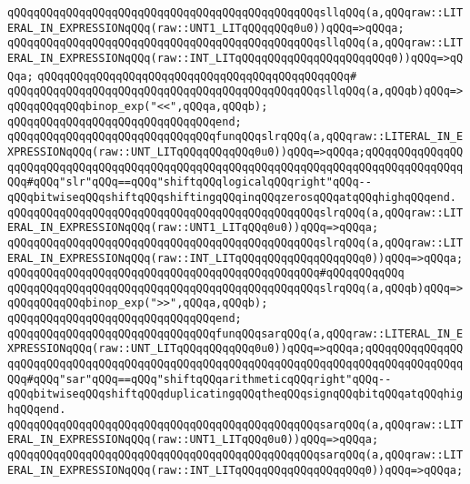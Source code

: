 \verb|qQQqqQQqqQQqqQQqqQQqqQQqqQQqqQQqqQQqqQQqqQQqqQQqsllqQQq(a,qQQqraw::LITERAL_IN_EXPRESSIONqQQq(raw::UNT1_LITqQQqqQQq0u0))qQQq=>qQQqa;|\newline
\verb|qQQqqQQqqQQqqQQqqQQqqQQqqQQqqQQqqQQqqQQqqQQqqQQqsllqQQq(a,qQQqraw::LITERAL_IN_EXPRESSIONqQQq(raw::INT_LITqQQqqQQqqQQqqQQqqQQqqQQq0))qQQq=>qQQqa;|\newline
\verb|qQQqqQQqqQQqqQQqqQQqqQQqqQQqqQQqqQQqqQQqqQQqqQQq#|\newline
\verb|qQQqqQQqqQQqqQQqqQQqqQQqqQQqqQQqqQQqqQQqqQQqqQQqsllqQQq(a,qQQqb)qQQq=>qQQqqQQqqQQqbinop_exp("<<",qQQqa,qQQqb);|\newline
\verb|qQQqqQQqqQQqqQQqqQQqqQQqqQQqqQQqend;|\newline
\newline
\verb|qQQqqQQqqQQqqQQqqQQqqQQqqQQqqQQqfunqQQqslrqQQq(a,qQQqraw::LITERAL_IN_EXPRESSIONqQQq(raw::UNT_LITqQQqqQQqqQQq0u0))qQQq=>qQQqa;qQQqqQQqqQQqqQQqqQQqqQQqqQQqqQQqqQQqqQQqqQQqqQQqqQQqqQQqqQQqqQQqqQQqqQQqqQQqqQQqqQQqqQQq#qQQq"slr"qQQq==qQQq"shiftqQQqlogicalqQQqright"qQQq--qQQqbitwiseqQQqshiftqQQqshiftingqQQqinqQQqzerosqQQqatqQQqhighqQQqend.|\newline
\verb|qQQqqQQqqQQqqQQqqQQqqQQqqQQqqQQqqQQqqQQqqQQqqQQqslrqQQq(a,qQQqraw::LITERAL_IN_EXPRESSIONqQQq(raw::UNT1_LITqQQq0u0))qQQq=>qQQqa;|\newline
\verb|qQQqqQQqqQQqqQQqqQQqqQQqqQQqqQQqqQQqqQQqqQQqqQQqslrqQQq(a,qQQqraw::LITERAL_IN_EXPRESSIONqQQq(raw::INT_LITqQQqqQQqqQQqqQQqqQQq0))qQQq=>qQQqa;|\newline
\verb|qQQqqQQqqQQqqQQqqQQqqQQqqQQqqQQqqQQqqQQqqQQqqQQq#qQQqqQQqqQQq|\newline
\verb|qQQqqQQqqQQqqQQqqQQqqQQqqQQqqQQqqQQqqQQqqQQqqQQqslrqQQq(a,qQQqb)qQQq=>qQQqqQQqqQQqbinop_exp(">>",qQQqa,qQQqb);|\newline
\verb|qQQqqQQqqQQqqQQqqQQqqQQqqQQqqQQqend;|\newline
\newline
\verb|qQQqqQQqqQQqqQQqqQQqqQQqqQQqqQQqfunqQQqsarqQQq(a,qQQqraw::LITERAL_IN_EXPRESSIONqQQq(raw::UNT_LITqQQqqQQqqQQq0u0))qQQq=>qQQqa;qQQqqQQqqQQqqQQqqQQqqQQqqQQqqQQqqQQqqQQqqQQqqQQqqQQqqQQqqQQqqQQqqQQqqQQqqQQqqQQqqQQqqQQq#qQQq"sar"qQQq==qQQq"shiftqQQqarithmeticqQQqright"qQQq--qQQqbitwiseqQQqshiftqQQqduplicatingqQQqtheqQQqsignqQQqbitqQQqatqQQqhighqQQqend.|\newline
\verb|qQQqqQQqqQQqqQQqqQQqqQQqqQQqqQQqqQQqqQQqqQQqqQQqsarqQQq(a,qQQqraw::LITERAL_IN_EXPRESSIONqQQq(raw::UNT1_LITqQQq0u0))qQQq=>qQQqa;|\newline
\verb|qQQqqQQqqQQqqQQqqQQqqQQqqQQqqQQqqQQqqQQqqQQqqQQqsarqQQq(a,qQQqraw::LITERAL_IN_EXPRESSIONqQQq(raw::INT_LITqQQqqQQqqQQqqQQqqQQq0))qQQq=>qQQqa;|\newline
